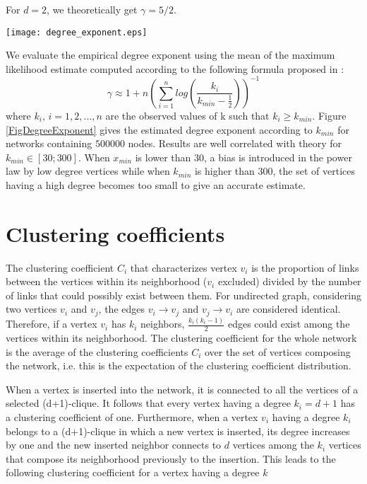 \documentclass[11pt]{iopart}
\begin{document}
For $d=2$, we theoretically get  $\gamma = 5/2$.

\begin{figure*}[htbp]
\centering
\texttt{[image: degree\_exponent.eps]}
\caption{Degree exponent estimation for a 2-dimensional P-RAN containing 200000 vertices according to Eq.\ref{degreeExponentEstimate}}
\label{FigDegreeExponent}
\end{figure*}

We evaluate the empirical degree exponent using the mean of the maximum likelihood estimate computed according to the following formula proposed in \cite{clauset-2007} :
\begin{equation}
\gamma\approx 1+n\left(\sum_{i=1}^{n} log\left(\frac{k_i}{k_{min}-\frac{1}{2}}\right)\right)^{-1}
\label{degreeExponentEstimate}
\end{equation}
where $k_i$, $i = 1,2,...,n$ are the observed values of k such that $k_i \ge k_{min}$.
Figure \ref{FigDegreeExponent} gives the estimated degree exponent according to $k_{min}$ for networks containing $500000$ nodes. Results are well correlated with theory for $k_{min} \in [30;300]$. When $x_{min}$ is lower than $30$, a bias is introduced in the power law by low degree vertices while when $k_{min}$ is higher than $300$, the set of vertices having a high degree becomes too small to give an accurate estimate. 

\section{Clustering coefficients}
The clustering coefficient $C_i$ that characterizes vertex $v_i$ is the proportion of links between the vertices within its neighborhood ($v_i$ excluded) divided by the number of links that could possibly exist between them. For undirected graph, considering two vertices $v_i$ and $v_j$, the edges $v_i \rightarrow v_j$ and $v_j \rightarrow v_i$ are considered identical. Therefore, if a vertex $v_i$ has $k_i$ neighbors, $\frac{k_i(k_i-1)}{2}$ edges could exist among the vertices within its neighborhood. The clustering coefficient for the whole network is the average of the clustering coefficients $C_i$ over the set of vertices composing the network, i.e. this is the expectation of the clustering coefficient distribution.

When a vertex is inserted into the network, it is connected to all the vertices of a selected (d+1)-clique. It follows that every vertex having a degree $k_i=d+1$ has a clustering coefficient of one. Furthermore, when a vertex $v_i$ having a degree $k_i$  belongs to a (d+1)-clique in which a new vertex is inserted, its degree increases by one and the new inserted neighbor connects to $d$ vertices among the $k_i$ vertices that compose its neighborhood previously to the insertion. This leads to the following clustering coefficient for a vertex having a degree $k$
\end{document}
